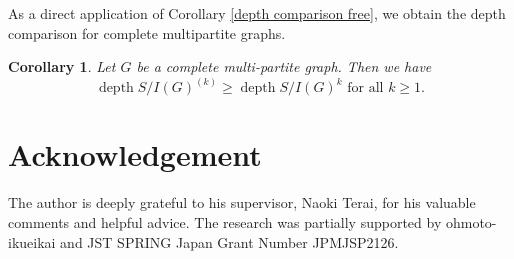 \documentclass[12pt]{amsart}
\newtheorem{cor}[thm]{Corollary}
\theoremstyle{definition}
\theoremstyle{remark}
\DeclareMathOperator{\depth}{depth}
\begin{document}
As a direct application of Corollary \ref{depth comparison free}, we obtain the depth comparison for complete multipartite graphs. 

\begin{cor}
Let $G$ be a complete multi-partite graph. Then we have 
$$\depth S/I(G)^{(k)}\geq\depth S/I(G)^{k}\mbox{ for all }k\geq1.$$
\end{cor}




\section*{Acknowledgement}
The author is deeply grateful to his supervisor, Naoki Terai, for his valuable comments and helpful advice. The research was partially supported by ohmoto-ikueikai and JST SPRING Japan Grant Number JPMJSP2126. 

\end{document}
